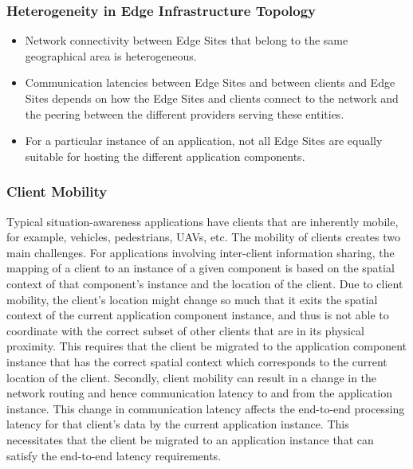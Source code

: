 \subsubsection{Heterogeneity in Edge Infrastructure Topology}
\begin{itemize}
\item Network connectivity between Edge Sites that belong to the same geographical area is heterogeneous.
\item Communication latencies between Edge Sites and between clients and Edge Sites depends on how the Edge Sites and clients connect to the network and the peering between the different providers serving these entities.
\item For a particular instance of an application, not all Edge Sites are equally suitable for hosting the different application components.
\end{itemize}

\subsubsection{Client Mobility}
Typical situation-awareness applications have clients that are inherently mobile, for example, vehicles, pedestrians, UAVs, etc. The mobility of clients creates two main challenges. For applications involving inter-client information sharing, the mapping of a client to an instance of a given component is based on the spatial context of that component's instance and the location of the client. Due to client mobility, the client's location might change so much that it exits the spatial context of the current application component instance, and thus is not able to coordinate with the correct subset of other clients that are in its physical proximity. This requires that the client be migrated to the application component instance that has the correct spatial context which corresponds to the current location of the client. Secondly, client mobility can result in a change in the network routing and hence communication latency to and from the application instance. This change in communication latency affects the end-to-end processing latency for that client's data by the current application instance. This necessitates that the client be migrated to an application instance that can satisfy the end-to-end latency requirements.

